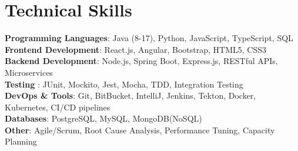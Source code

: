 \section{Technical Skills}
\begin{itemize}[leftmargin=0.15in, label={}]
    \small{
    \item{
     \textbf{Programming Languages}: 
Java (8-17), Python, JavaScript, TypeScript, SQL \\
\vspace{1pt}
\textbf{Frontend Development}: 
React.js, Angular, Bootstrap, HTML5, CSS3 \\ \vspace{1pt}
\textbf{Backend Development}: 
Node.js, Spring Boot, Express.js, RESTful APIs, Microservices \\ \vspace{1pt}
     \textbf{\textbf{Testing}
}: 
JUnit, Mockito, Jest, Mocha, TDD, Integration Testing
\\
\vspace{1pt}
     \textbf{\textbf{DevOps \& Tools}}: 
Git, BitBucket, IntelliJ, Jenkins, Tekton, Docker, Kubernetes, CI/CD pipelines \\ \vspace{1pt}
     \textbf{Databases}: PostgreSQL, MySQL, MongoDB(NoSQL) \\ \vspace{1pt}
\textbf{\textbf{\textbf{\textbf{Other}}}}: Agile/Scrum, Root Cause Analysis, Performance Tuning, Capacity Planning
} }
 \end{itemize}
 \vspace{-10pt}